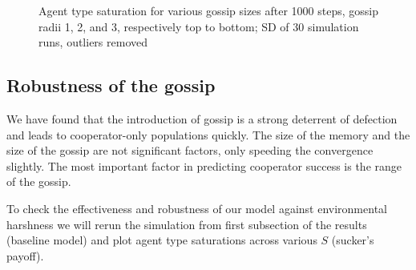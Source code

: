 \documentclass[english]{article}
\begin{document}
\begin{figure}[!h]
  \centering
  \caption{Agent type saturation for various gossip sizes after 1000 steps, gossip radii 1, 2, and 3, respectively top to bottom; SD of 30 simulation runs, outliers removed}
  \label{fig:agent_sat/gossip_size_step1000}
\end{figure}


\subsection{Robustness of the gossip}
We have found that the introduction of gossip is a strong deterrent of defection and leads to cooperator-only populations quickly.
The size of the memory and the size of the gossip are not significant factors, only speeding the convergence slightly.
The most important factor in predicting cooperator success is the range of the gossip.

To check the effectiveness and robustness of our model against environmental harshness we will rerun the simulation from first subsection of the results (baseline model) and plot agent type saturations across various $S$ (sucker's payoff).
\end{document}
